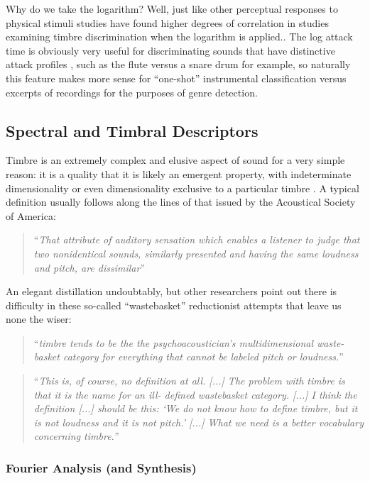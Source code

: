 {{Why do we take the logarithm? Well, just like other perceptual responses to physical stimuli  studies have found higher degrees of correlation in studies examining timbre discrimination when the logarithm is applied.\citep{McAdams1995, McAdams1999, Agres2016}. The log attack time is obviously very useful for discriminating sounds that have distinctive attack profiles \citep{Herrera-Boyer2003}, such as the flute versus a snare drum for example, so naturally this feature makes more sense for ``one-shot'' instrumental classification versus excerpts of recordings for the purposes of genre detection.

\subsection{Spectral and Timbral Descriptors}

Timbre is an extremely complex and elusive aspect of sound for a very simple reason: it is a quality that it is likely an emergent property, with indeterminate dimensionality \citep{Elliott2013, Siedenburg2017} or even dimensionality exclusive to a particular timbre \citep{Krumhansl1989}. A typical definition usually follows along the lines of that issued by the Acoustical Society of America:

\blockcquote[]{ansi}{``\textit{That attribute of auditory sensation which enables a listener to judge that two nonidentical sounds, similarly presented and having the same loudness and pitch, are dissimilar}''} 

An elegant distillation undoubtably, but other researchers point out \citep{Siedenburg2017} there is difficulty in these so-called ``wastebasket'' reductionist attempts that leave us none the wiser:

\blockcquote[]{McAdams1979}{``\textit{timbre tends to be the the psychoacoustician's multidimensional waste-basket category for everything that cannot be labeled pitch or loudness.}''} 

\blockcquote[]{Bregman1994}{``\textit{This is, of course, no definition at all. [...] The problem with timbre is that it is the name for an ill- defined wastebasket category. [...] I think the definition [...] should be this: ‘We do not know how to define timbre, but it is not loudness and it is not pitch.’ [...] What we need is a better vocabulary concerning timbre.''}}

\subsubsection{Fourier Analysis (and Synthesis)}

}}
